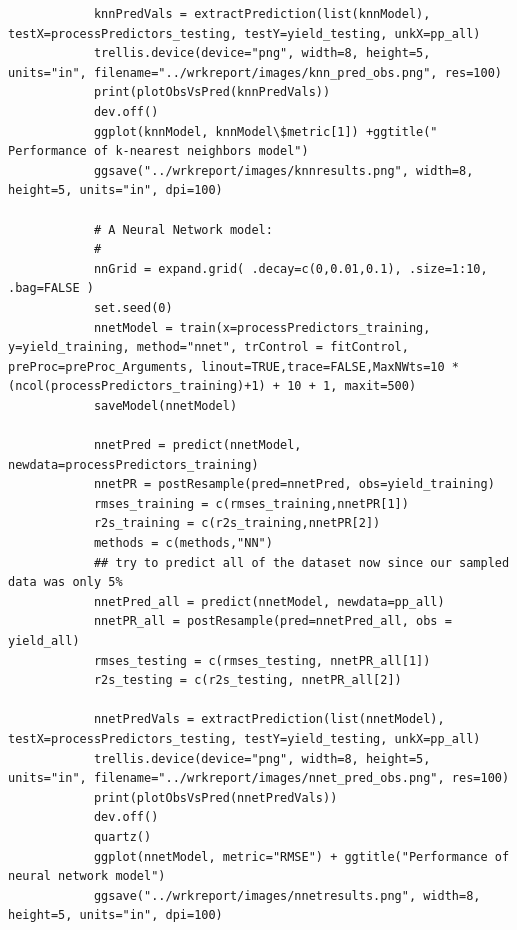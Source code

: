 \documentclass[letterpaper,12pt,titlepage,oneside,final]{report}
\begin{document}
\begin{multicols}{2}
\begin{verbatim}
            knnPredVals = extractPrediction(list(knnModel), testX=processPredictors_testing, testY=yield_testing, unkX=pp_all)
            trellis.device(device="png", width=8, height=5, units="in", filename="../wrkreport/images/knn_pred_obs.png", res=100)
            print(plotObsVsPred(knnPredVals))
            dev.off() 
            ggplot(knnModel, knnModel\$metric[1]) +ggtitle(" Performance of k-nearest neighbors model")
            ggsave("../wrkreport/images/knnresults.png", width=8, height=5, units="in", dpi=100)

            # A Neural Network model:
            #
            nnGrid = expand.grid( .decay=c(0,0.01,0.1), .size=1:10, .bag=FALSE )
            set.seed(0)
            nnetModel = train(x=processPredictors_training, y=yield_training, method="nnet", trControl = fitControl, preProc=preProc_Arguments, linout=TRUE,trace=FALSE,MaxNWts=10 * (ncol(processPredictors_training)+1) + 10 + 1, maxit=500)
            saveModel(nnetModel)

            nnetPred = predict(nnetModel, newdata=processPredictors_training)
            nnetPR = postResample(pred=nnetPred, obs=yield_training)
            rmses_training = c(rmses_training,nnetPR[1])
            r2s_training = c(r2s_training,nnetPR[2])
            methods = c(methods,"NN")
            ## try to predict all of the dataset now since our sampled data was only 5%
            nnetPred_all = predict(nnetModel, newdata=pp_all)
            nnetPR_all = postResample(pred=nnetPred_all, obs = yield_all)
            rmses_testing = c(rmses_testing, nnetPR_all[1])
            r2s_testing = c(r2s_testing, nnetPR_all[2])

            nnetPredVals = extractPrediction(list(nnetModel), testX=processPredictors_testing, testY=yield_testing, unkX=pp_all)
            trellis.device(device="png", width=8, height=5, units="in", filename="../wrkreport/images/nnet_pred_obs.png", res=100)
            print(plotObsVsPred(nnetPredVals))
            dev.off()
            quartz()
            ggplot(nnetModel, metric="RMSE") + ggtitle("Performance of neural network model")
            ggsave("../wrkreport/images/nnetresults.png", width=8, height=5, units="in", dpi=100)


\end{verbatim}
\end{multicols}
\end{document}
